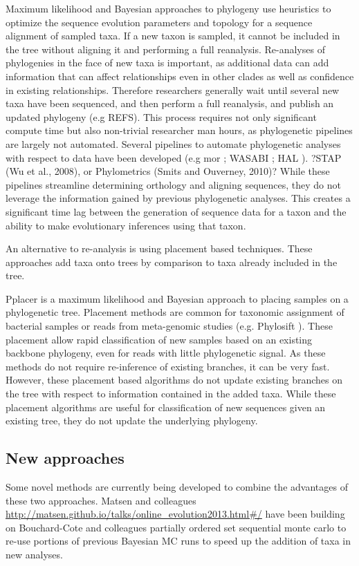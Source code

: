 \documentclass[10pt]{article}
\begin{document}
Maximum likelihood and Bayesian approaches to phylogeny use heuristics to optimize the sequence evolution parameters and topology for a sequence alignment of sampled taxa. 
If a new taxon is sampled, it cannot be included in the tree without aligning it and performing a full reanalysis. 
 Re-analyses of phylogenies in the face of new taxa is important, as additional data can add information that can affect relationships even in other clades as well as confidence in existing relationships. 
Therefore researchers generally wait until several new taxa have been sequenced, and then perform a full reanalysis, and publish an updated phylogeny (e.g REFS). 
This process requires not only significant compute time but also non-trivial researcher man hours, as phylogenetic pipelines are largely not automated. 
Several pipelines to automate phylogenetic analyses with respect to data have been developed (e.g mor \cite{hibbett_automated_2005}; WASABI \cite{kauff_WASABI:_2007}; HAL \cite{robbertse_hal:_2011}). 
?STAP (Wu et al., 2008), or Phylometrics (Smits and Ouverney, 2010)? While these pipelines streamline determining orthology and aligning sequences, they do not leverage the information gained by previous phylogenetic analyses. 
This creates a significant time lag between the generation of sequence data for a taxon and the ability to make evolutionary inferences using that taxon.

An alternative to re-analysis is using placement based techniques. 
These approaches add taxa onto trees by comparison to taxa already included in the tree. 

Pplacer \cite{matsen_pplacer:_2010} is a maximum likelihood and Bayesian approach to placing samples on a phylogenetic tree. 
Placement methods are common for taxonomic assignment of bacterial samples or reads from meta-genomic studies (e.g. 
Phylosift \cite{darling_phylosift:_2014}). 
These placement allow rapid classification of new samples based on an existing backbone phylogeny, even for reads with little phylogenetic signal. 
As these methods do not require re-inference of existing branches, it can be very fast. 
However, these placement based algorithms do not update existing branches on the tree with respect to information contained in the added taxa. 
While these placement algorithms are useful for classification of new sequences given an existing tree, they do not update the underlying phylogeny.

\subsection*{New approaches}
Some novel methods are currently being developed to combine the advantages of these two approaches. 
Matsen and colleagues \url{http://matsen.github.io/talks/online_evolution2013.html#/} have been building on Bouchard-Cote and colleagues partially ordered set sequential monte carlo \cite{bouchard-cote_phylogenetic_2012} to re-use portions of previous Bayesian MC runs to speed up the addition of taxa in new analyses.
\end{document}
